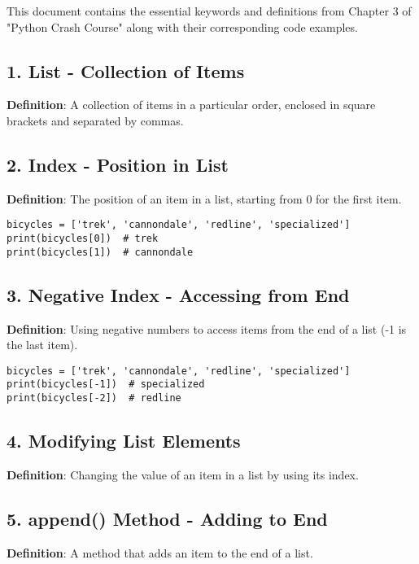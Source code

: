 
This document contains the essential keywords and definitions from Chapter 3 of "Python Crash Course" along with their corresponding code examples.

\subsection*{1. List - Collection of Items}
\textbf{Definition}: A collection of items in a particular order, enclosed in square brackets and separated by commas.



\subsection*{2. Index - Position in List}
\textbf{Definition}: The position of an item in a list, starting from 0 for the first item.

\begin{lstlisting}
bicycles = ['trek', 'cannondale', 'redline', 'specialized']
print(bicycles[0])  # trek
print(bicycles[1])  # cannondale
\end{lstlisting}

\subsection*{3. Negative Index - Accessing from End}
\textbf{Definition}: Using negative numbers to access items from the end of a list (-1 is the last item).

\begin{lstlisting}
bicycles = ['trek', 'cannondale', 'redline', 'specialized']
print(bicycles[-1])  # specialized
print(bicycles[-2])  # redline
\end{lstlisting}

\subsection*{4. Modifying List Elements}
\textbf{Definition}: Changing the value of an item in a list by using its index.



\subsection*{5. append() Method - Adding to End}
\textbf{Definition}: A method that adds an item to the end of a list.

